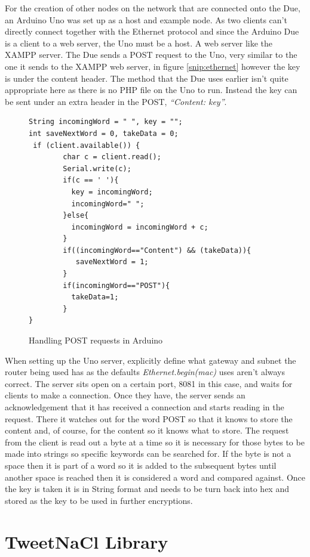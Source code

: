 For the creation of other nodes on the network that are connected onto the Due, an Arduino Uno was set up as a host and example node. As two clients can't directly connect together with the Ethernet protocol and since the Arduino Due is a client to a web server, the Uno must be a host. A web server like the XAMPP server.
The Due sends a POST request to the Uno, very similar to the one it sends to the XAMPP web server, in figure \ref{snip:ethernet} however the key is under the content header. The method that the Due uses earlier isn't quite appropriate here as there is no PHP file on the Uno to run. Instead the key can be sent under an extra header in the POST, \emph{``Content: key''}.

\begin{figure}[H]
\begin{lstlisting}[style=Arduino]
String incomingWord = " ", key = "";
int saveNextWord = 0, takeData = 0;
 if (client.available()) {
        char c = client.read();
        Serial.write(c);
        if(c == ' '){
          key = incomingWord;
          incomingWord=" ";
        }else{
          incomingWord = incomingWord + c;
        }
        if((incomingWord=="Content") && (takeData)){
           saveNextWord = 1; 
        }
        if(incomingWord=="POST"){
          takeData=1;
        }
}
\end{lstlisting}
\caption{Handling POST requests in Arduino}
\label{snip:post}
\end{figure}

When setting up the Uno server, explicitly define what gateway and subnet the router being used has as the defaults \emph{Ethernet.begin(mac)} uses aren't always correct. The server sits open on a certain port, 8081 in this case, and waits for clients to make a connection. Once they have, the server sends an acknowledgement that it has received a connection and starts reading in the request. There it watches out for the word POST so that it knows to store the content and, of course, for the content so it knows what to store. The request from the client is read out a byte at a time so it is necessary for those bytes to be made into strings so specific keywords can be searched for. If the byte is not a space then it is part of a word so it is added to the subsequent bytes until another space is reached then it is considered a word and compared against. Once the key is taken it is in String format and needs to be turn back into hex and stored as the key to be used in further encryptions.


\section{TweetNaCl Library}

